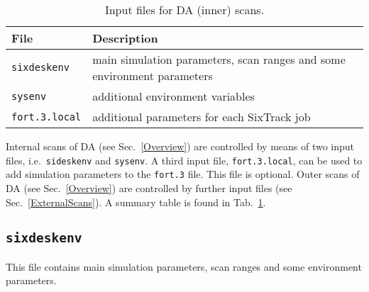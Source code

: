 \begin{table}[h]
\begin{center}
    \caption{Input files for DA (inner) scans.}
    \label{tab:InnerScanInputFiles}
    \begin{tabular}{|l|l|}
    \hline
    \rowcolor{blue!30}
    \textbf{File} & \textbf{Description} \\
    \hline
    \texttt{sixdeskenv} & main simulation parameters, scan ranges and some environment parameters \\
    \hline
    \texttt{sysenv} & additional environment variables \\
    \hline
    \texttt{fort.3.local} & additional parameters for each SixTrack job \\
    \hline
    \end{tabular}
\end{center}
\end{table}
Internal scans of DA (see Sec.~\ref{Overview}) are controlled by means of two input
files, i.e.~\texttt{sideskenv} and \texttt{sysenv}. A third input file,
\texttt{fort.3.local}, can be used to add simulation parameters to
the \texttt{fort.3} file. This file is optional. Outer scans of DA (see
Sec.~\ref{Overview}) are controlled by further input files (see
Sec.~\ref{ExternalScans}).
A summary table is found in Tab.~\ref{tab:InnerScanInputFiles}.

\subsection{\texttt{sixdeskenv}}\label{Sec:InputFiles:sixdeskenv}
This file contains main simulation parameters, scan ranges and some environment
parameters.

